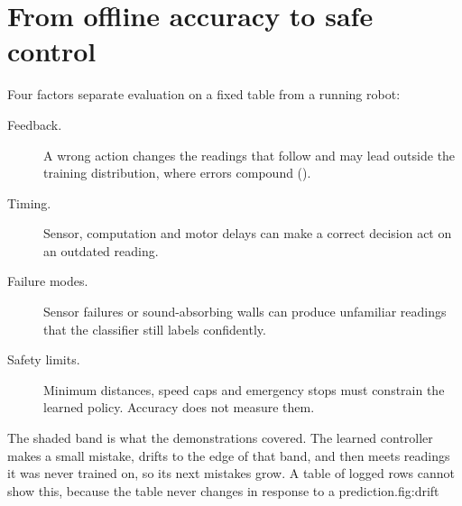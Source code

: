 \section{From offline accuracy to safe control}

Four factors separate evaluation on a fixed table from a running robot:

\begin{description}
  \item[Feedback.] A wrong action changes the readings that follow and may lead outside the training distribution, where errors compound ().
  \item[Timing.] Sensor, computation and motor delays can make a correct decision act on an outdated reading.
  \item[Failure modes.] Sensor failures or sound-absorbing walls can produce unfamiliar readings that the classifier still labels confidently.
  \item[Safety limits.] Minimum distances, speed caps and emergency stops must constrain the learned policy. Accuracy does not measure them.
\end{description}

\begin{utpfig}{The shaded band is what the demonstrations covered. The learned controller makes a small mistake, drifts to the edge of that band, and then meets readings it was never trained on, so its next mistakes grow. A table of logged rows cannot show this, because the table never changes in response to a prediction.}{fig:drift}
\end{utpfig}

